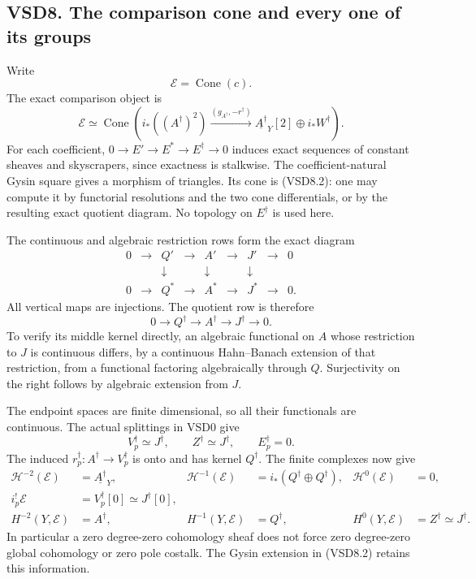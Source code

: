 \subsection{VSD8. The comparison cone and every one of its
groups}\label{vsd8.-the-comparison-cone-and-every-one-of-its-groups}

Write \[
\mathscr E=\operatorname{Cone}(c).
\tag{VSD8.1}
\] The exact comparison object is \[
\boxed{\mathscr E\simeq
\operatorname{Cone}\left(
i_*((A^\dagger)^2)\xrightarrow{(g_{A^\dagger},-r^\dagger)}
\underline{A^\dagger}_Y[2]\oplus i_*W^\dagger
\right).}
\tag{VSD8.2}
\] For each coefficient, \(0\to E'\to E^*\to E^\dagger\to0\) induces
exact sequences of constant sheaves and skyscrapers, since exactness is
stalkwise. The coefficient-natural Gysin square gives a morphism of
triangles. Its cone is (VSD8.2): one may compute it by functorial
resolutions and the two cone differentials, or by the resulting exact
quotient diagram. No topology on \(E^\dagger\) is used here.

The continuous and algebraic restriction rows form the exact diagram \[
\begin{array}{ccccccccc}
0&\to&Q'&\to&A'&\to&J'&\to&0\\
&&\downarrow&&\downarrow&&\downarrow\\
0&\to&Q^*&\to&A^*&\to&J^*&\to&0 .
\end{array}
\tag{VSD8.3}
\] All vertical maps are injections. The quotient row is therefore \[
0\to Q^\dagger\to A^\dagger\to J^\dagger\to0 .
\tag{VSD8.4}
\] To verify its middle kernel directly, an algebraic functional on
\(A\) whose restriction to \(J\) is continuous differs, by a continuous
Hahn--Banach extension of that restriction, from a functional factoring
algebraically through \(Q\). Surjectivity on the right follows by
algebraic extension from \(J\).

The endpoint spaces are finite dimensional, so all their functionals are
continuous. The actual splittings in VSD0 give \[
V_p^\dagger\simeq J^\dagger,\qquad
Z^\dagger\simeq J^\dagger,\qquad E_p^\dagger=0 .
\tag{VSD8.5}
\] The induced \(r_p^\dagger:A^\dagger\to V_p^\dagger\) is onto and has
kernel \(Q^\dagger\). The finite complexes now give \[
\boxed{
\begin{aligned}
\mathcal H^{-2}(\mathscr E)&=\underline{A^\dagger}_Y,&
\mathcal H^{-1}(\mathscr E)&=i_*(Q^\dagger\oplus Q^\dagger),&
\mathcal H^0(\mathscr E)&=0,\\
i_p^!\mathscr E&=V_p^\dagger[0]\simeq J^\dagger[0],\\
H^{-2}(Y,\mathscr E)&=A^\dagger,&
H^{-1}(Y,\mathscr E)&=Q^\dagger,&
H^0(Y,\mathscr E)&=Z^\dagger\simeq J^\dagger .
\end{aligned}}
\tag{VSD8.6}
\] In particular a zero degree-zero cohomology sheaf does not force zero
degree-zero global cohomology or zero pole costalk. The Gysin extension
in (VSD8.2) retains this information.

